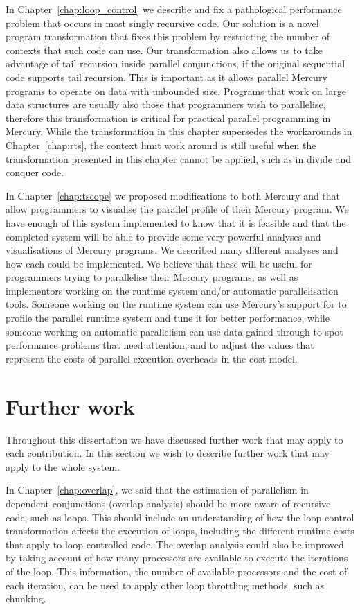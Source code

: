 In Chapter~\ref{chap:loop_control}
we describe and fix a pathological performance problem that occurs in most
singly recursive code.
Our solution is a novel program transformation that fixes this problem by
restricting the number of contexts that such code can use.
Our transformation also
allows us to take advantage of tail recursion inside parallel conjunctions,
if the original sequential code supports tail recursion.
This is important as it allows parallel Mercury programs to operate on data
with unbounded size.
Programs that work on large data structures are usually also those that
programmers wish to parallelise,
therefore this transformation is critical for practical parallel programming
in Mercury.
While the transformation in this chapter supersedes the workarounds in
Chapter~\ref{chap:rts},
the context limit work around is still useful when the transformation
presented in this chapter cannot
be applied, such as in divide and conquer code.

In Chapter~\ref{chap:tscope} we proposed modifications to both Mercury and
\tscope that allow programmers to visualise the parallel profile of their
Mercury program.
We have enough of this system implemented to know that it is feasible and
that the completed system will be able to provide some very powerful
analyses and visualisations of Mercury programs.
We described many different analyses and how each could be implemented.
We believe that these will be useful for programmers trying to parallelise
their Mercury programs, as well as implementors working on the runtime
system and/or automatic parallelisation tools.
Someone working on the runtime system can use Mercury's support for \tscope
to profile the parallel runtime system and tune it for better performance,
while someone working on automatic parallelism can use data gained through
\tscope to spot performance problems that need attention,
and to adjust the values that represent the costs of parallel execution
overheads in the cost model.

\section{Further work}
\label{sec:conc_further_work}

Throughout this dissertation we have discussed further work that may apply to
each contribution.
In this section we wish to describe further work that may apply to the whole
system.

In Chapter~\ref{chap:overlap},
we said that the estimation of parallelism in dependent conjunctions
(overlap analysis) should be more aware of recursive code, such as loops.
This should include an understanding of how the loop control transformation
affects the execution of loops,
including the different runtime costs that apply to loop controlled code.
The overlap analysis could also be improved by taking account of how many
processors are available to execute the iterations of the loop.
This information,
the number of available processors and the cost of each iteration,
can be used to apply other loop throttling methods,
such as chunking.

